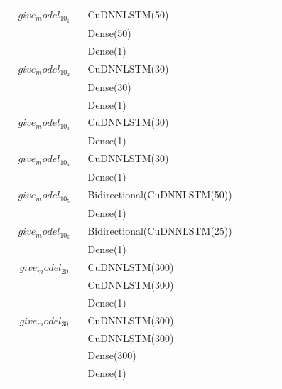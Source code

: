 \begin{longtable}{| c | m{0.58\linewidth} | r | m{0.1\linewidth} |}
    $give_model_10_1$              & CuDNNLSTM(50)                 \\
                                   & Dense(50)                     \\
                                   & Dense(1)                      \\ \hline

    $give_model_10_2$              & CuDNNLSTM(30)                 \\
                                   & Dense(30)                     \\
                                   & Dense(1)                      \\ \hline
    $give_model_10_3$              & CuDNNLSTM(30)                 \\
                                   & Dense(1)                      \\ \hline
    $give_model_10_4$              & CuDNNLSTM(30)                 \\
                                   & Dense(1)                      \\ \hline
    $give_model_10_5$              & Bidirectional(CuDNNLSTM(50))  \\
                                   & Dense(1)                      \\ \hline
    $give_model_10_6$              & Bidirectional(CuDNNLSTM(25))  \\
                                   & Dense(1)                      \\ \hline


    $give_model_20$                & CuDNNLSTM(300)                \\
                                   & CuDNNLSTM(300)                \\
                                   & Dense(1)                      \\ \hline

    $give_model_30$                & CuDNNLSTM(300)                \\
                                   & CuDNNLSTM(300)                \\
                                   & Dense(300)                    \\
                                   & Dense(1)                      \\ \hline


\end{longtable}
